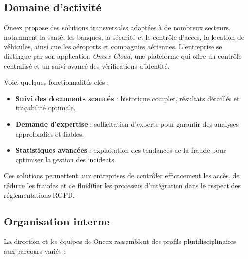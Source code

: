 \subsection{Domaine d'activité}

Oneex propose des solutions transversales adaptées à de nombreux secteurs, notamment la santé, les banques, la sécurité et le contrôle d’accès, la location de véhicules, ainsi que les aéroports et compagnies aériennes. L’entreprise se distingue par son application \emph{Oneex Cloud}, une plateforme qui offre un contrôle centralisé et un suivi avancé des vérifications d’identité.

Voici quelques fonctionnalités clés :

\begin{itemize}
	\item \textbf{Suivi des documents scannés} : historique complet, résultats détaillés et traçabilité optimale.
	\item \textbf{Demande d’expertise} : sollicitation d’experts pour garantir des analyses approfondies et fiables.
	\item \textbf{Statistiques avancées} : exploitation des tendances de la fraude pour optimiser la gestion des incidents.
\end{itemize}

Ces solutions permettent aux entreprises de contrôler efficacement les accès, de réduire les fraudes et de fluidifier les processus d’intégration dans le respect des réglementations RGPD.

\subsection{Organisation interne}

La direction et les équipes de Oneex rassemblent des profils pluridisciplinaires aux parcours variés :

